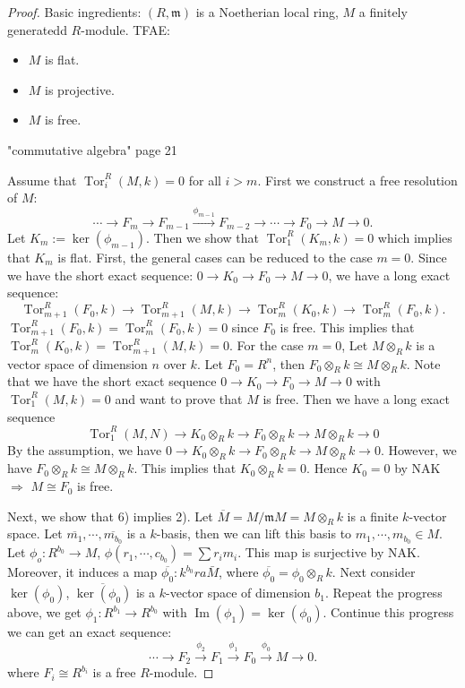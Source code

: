\documentclass[cs4size]{article}
\newcommand{\frm}{\mathfrak{m}}
\newcommand{\ra}{\rightarrow}
\newcommand{\xr}{\xrightarrow}
\newcommand{\Ra}{\Rightarrow}
\DeclareMathOperator{\Tor}{Tor}
\DeclareMathOperator{\Image}{Im}
\begin{document}
\begin{proof}
Basic ingredients:
$(R,\frm)$ is a Noetherian local ring, $M$ a finitely generatedd $R$-module. TFAE:
\begin{itemize}
\item $M$ is flat.
\item $M$ is projective.
\item $M$ is free.
\end{itemize}
"commutative algebra" page 21

Assume that $\Tor_i^R(M,k)=0$ for all $i>m$. First we construct a free resolution of $M$:
\[\cdots \ra F_m\ra F_{m-1}\xr {\phi_{m-1}}F_{m-2}\ra \cdots\ra F_0\ra M\ra 0.\]
Let $K_m:=\ker (\phi_{m-1})$. Then we show that $\Tor_1^R(K_m,k)=0$ which implies that $K_m$ is flat. First, the general cases can be reduced to the case $m=0$. Since we have the short exact sequence: $0\ra K_0\ra F_0\ra M\ra 0$, we have a long exact sequence:
\[\Tor_{m+1}^R(F_0,k)\ra \Tor_{m+1}^R(M,k)\ra \Tor_m^R(K_0,k)\ra \Tor_m^R(F_0,k).\]
$\Tor_{m+1}^R(F_0,k)=\Tor_m^R(F_0,k)=0$ since $F_0$ is free. This implies that $\Tor_m^R(K_0,k)=\Tor_{m+1}^R(M,k)=0$. For the case $m=0$, Let $M\otimes_R k$ is a vector space of dimension $n$ over $k$. Let $F_0=R^n$, then $F_0\otimes_Rk\cong M\otimes_Rk$. Note that we have the short exact sequence $0\ra K_0\ra F_0\ra M\ra 0$ with $\Tor_1^R(M,k)=0$ and want to prove that $M$ is free. Then we have a long exact sequence
\[\Tor_1^R(M,N)\ra K_0\otimes_Rk\ra F_0\otimes_Rk\ra M\otimes_Rk\ra0\]
By the assumption, we have $0\ra K_0\otimes_Rk\ra F_0\otimes_Rk\ra M\otimes_Rk\ra0$. However, we have $F_0\otimes_Rk\cong M\otimes_Rk$. This implies that $K_0\otimes_Rk=0$. Hence $K_0=0$ by NAK $\Ra$ $M\cong F_0$ is free.

Next, we show that 6) implies 2). Let $\overline{M}=M/\frm M=M\otimes_Rk$ is a finite $k$-vector space. Let $\overline{m_1},\cdots,\overline{m_{b_0}}$ is a $k$-basis, then we can lift this basis to $m_1,\cdots,m_{b_0}\in M$. Let $\phi_o: R^{b_0}\ra M$, $\phi(r_1,\cdots,c_{b_0})=\sum r_im_i$. This map is surjective by NAK. Moreover, it induces a map $\overline{\phi_0}: k^{b_0}ra \bar{M}$, where $\overline{\phi_0}=\phi_0\otimes_Rk$. Next consider $\ker(\phi_0)$, $\overline{\ker(\phi_0)}$ is a $k$-vector space of dimension $b_1$. Repeat the progress above, we get $\phi_1: R^{b_1}\ra R^{b_0}$ with $\Image(\phi_1)=\ker (\phi_0)$. Continue this progress we can get an exact sequence:
\[\cdots\ra F_2\xr{\phi_2}F_1\xr{\phi_1}F_0\xr{\phi_0}M\ra0.\]
where $F_i\cong R^{b_i}$ is a free $R$-module.


\end{proof}
\end{document}

